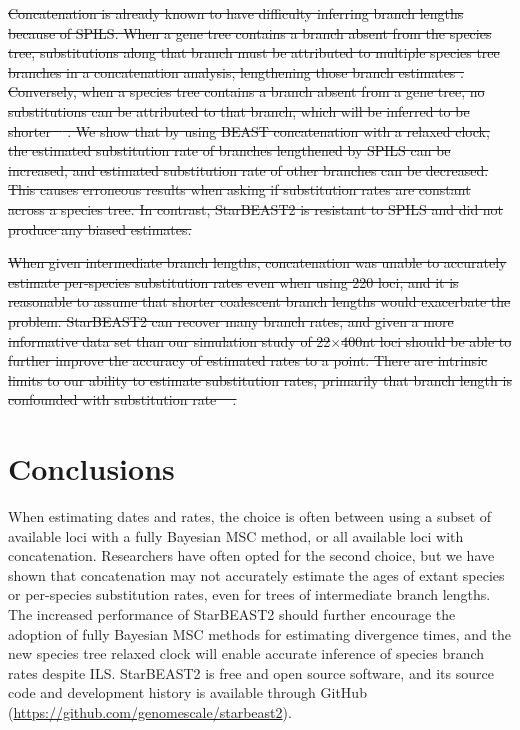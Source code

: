 \documentclass[12pt]{article}
\providecommand{\DIFdeltex}[1]{{\protect\color{red}\sout{#1}}}                      %
\providecommand{\DIFdelend}{} %
\providecommand{\DIFdel}[1]{\texorpdfstring{\DIFdeltex{#1}}{}} %
\begin{document}
\DIFdel{Concatenation is already known to have difficulty inferring branch lengths
because of SPILS. When a gene tree contains a branch absent from the species
tree, substitutions along that branch must be attributed to multiple species tree
branches in a concatenation analysis, lengthening those branch estimates . Conversely,
when a species tree contains a branch absent from a gene tree, no substitutions
can be attributed to that branch, which will be inferred to be shorter \mbox{%
\citep{Mendes01072016}}%
.
We show that by using BEAST concatenation with a relaxed
clock, the estimated substitution rate of branches lengthened by
SPILS can be increased, and estimated substitution rate of other
branches can be decreased. This causes erroneous results when asking if substitution rates
are constant across a species tree. In contrast, StarBEAST2 is resistant to
SPILS and did not produce any biased estimates.
}%

\DIFdel{When given intermediate branch lengths, concatenation was unable to accurately
estimate per-species substitution rates even when using 220 loci, and it is
reasonable to assume that shorter coalescent branch lengths would
exacerbate the problem. StarBEAST2 can recover many branch rates, and given a
more informative data set than our simulation study of 22$\times$400nt loci
should be able to further improve the accuracy of estimated rates to a point.
There are intrinsic limits to our ability to estimate substitution rates,
primarily that branch length is confounded with substitution rate
\mbox{%
\citep{Thorne01092002}}%
. }%

\DIFdelend \section{Conclusions}

When estimating dates and rates, the choice is often between using a subset of
available loci with a fully Bayesian MSC method, or all available loci with
concatenation. Researchers have often opted for the second choice, but we have
shown that concatenation may not accurately estimate the ages of extant species
or per-species substitution rates, even for trees of intermediate branch lengths. The
increased performance of StarBEAST2 should further encourage the adoption of
fully Bayesian MSC methods for estimating divergence times, and the new species
tree relaxed clock will enable accurate inference of species branch rates despite
ILS. StarBEAST2 is free and open source software, and its source code and
development history is available through GitHub
(\url{https://github.com/genomescale/starbeast2}).
\end{document}
